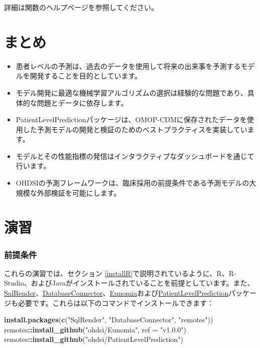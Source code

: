 \documentclass[
  11pt]{book}
\makeatletter
\newenvironment{Shaded}{\begin{snugshade}}{\end{snugshade}}
\newcommand{\AttributeTok}[1]{\textcolor[rgb]{0.13,0.29,0.53}{#1}}
\newcommand{\FunctionTok}[1]{\textcolor[rgb]{0.13,0.29,0.53}{\textbf{#1}}}
\newcommand{\NormalTok}[1]{#1}
\newcommand{\SpecialCharTok}[1]{\textcolor[rgb]{0.81,0.36,0.00}{\textbf{#1}}}
\newcommand{\StringTok}[1]{\textcolor[rgb]{0.31,0.60,0.02}{#1}}
\newenvironment{kframe}{%
\medskip{}
\setlength{\fboxsep}{.8em}
 \def\at@end@of@kframe{}%
 \ifinner\ifhmode%
  \def\at@end@of@kframe{\end{minipage}}%
  \begin{minipage}{\columnwidth}%
 \fi\fi%
 \def\FrameCommand##1{\hskip\@totalleftmargin \hskip-\fboxsep
 \colorbox{myShadeColor}{##1}\hskip-\fboxsep
     \hskip-\linewidth \hskip-\@totalleftmargin \hskip\columnwidth}%
 \MakeFramed {\advance\hsize-\width
   \@totalleftmargin\z@ \linewidth\hsize
   \@setminipage}}%
 {\par\unskip\endMakeFramed%
 \at@end@of@kframe}
\newenvironment{rmdblock}[1]
  {
  \begin{itemize}
  \renewcommand{\labelitemi}{
    \raisebox{-.7\height}[0pt][0pt]{
      {\setkeys{Gin}{width=3em,keepaspectratio}\texttt{[image: images/\#1]}}
    }
  }
  \setlength{\fboxsep}{1em}
  \begin{kframe}
  \item
  }
  {
  \end{kframe}
  \end{itemize}
  }
\newenvironment{rmdsummary}
  {\begin{rmdblock}{summary}}
  {\end{rmdblock}}
\theoremstyle{definition}
\theoremstyle{definition}
\theoremstyle{definition}
\theoremstyle{definition}
\theoremstyle{remark}
\makeatother
\begin{document}
詳細は関数のヘルプページを参照してください。

\section{まとめ}\label{ux307eux3068ux3081-10}

\begin{rmdsummary}
\begin{itemize}
\item
  患者レベルの予測は、過去のデータを使用して将来の出来事を予測するモデルを開発することを目的としています。
\item
  モデル開発に最適な機械学習アルゴリズムの選択は経験的な問題であり、具体的な問題とデータに依存します。
\item
  PatientLevelPredictionパッケージは、OMOP-CDMに保存されたデータを使用した予測モデルの開発と検証のためのベストプラクティスを実装しています。
\item
  モデルとその性能指標の発信はインタラクティブなダッシュボードを通じて行います。
\item
  OHDSIの予測フレームワークは、臨床採用の前提条件である予測モデルの大規模な外部検証を可能にします。
\end{itemize}
\end{rmdsummary}

\section{演習}\label{ux6f14ux7fd2-8}

\subsubsection*{前提条件}\label{ux524dux63d0ux6761ux4ef6-8}

これらの演習では、セクション \ref{installR}で説明されているように、R、R-Studio、およびJavaがインストールされていることを前提としています。また、\href{https://ohdsi.github.io/SqlRender/}{SqlRender}、\href{https://ohdsi.github.io/DatabaseConnector/}{DatabaseConnector}、\href{https://ohdsi.github.io/Eunomia/}{Eunomia}および\href{https://ohdsi.github.io/PatientLevelPrediction/}{PatientLevelPrediction}パッケージも必要です。これらは以下のコマンドでインストールできます：

\begin{Shaded}
\begin{Highlighting}[]
\FunctionTok{install.packages}\NormalTok{(}\FunctionTok{c}\NormalTok{(}\StringTok{"SqlRender"}\NormalTok{, }\StringTok{"DatabaseConnector"}\NormalTok{, }\StringTok{"remotes"}\NormalTok{))}
\NormalTok{remotes}\SpecialCharTok{::}\FunctionTok{install\_github}\NormalTok{(}\StringTok{"ohdsi/Eunomia"}\NormalTok{, }\AttributeTok{ref =} \StringTok{"v1.0.0"}\NormalTok{)}
\NormalTok{remotes}\SpecialCharTok{::}\FunctionTok{install\_github}\NormalTok{(}\StringTok{"ohdsi/PatientLevelPrediction"}\NormalTok{)}
\end{Highlighting}
\end{Shaded}
\end{document}

